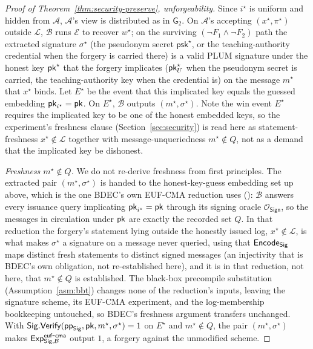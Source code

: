 \begin{proof}[Proof of Theorem~\ref{thm:security-preserve}, unforgeability]
Since $i^\star$ is uniform and hidden from $\mathcal A$, $\mathcal A$'s view is distributed as in $\mathsf G_2$. On $\mathcal A$'s accepting $(x^\star,\pi^\star)$ outside $\mathcal L$, $\mathcal B$ runs $\mathcal E$ to recover $w^\star$; on the surviving $(\neg F_1\wedge\neg F_2)$ path the extracted signature $\sigma^\star$ (the pseudonym secret $\mathsf{psk}^\star$, or the teaching-authority credential when the forgery is carried there) is a valid PLUM signature under the honest key $\mathsf{pk}^\star$ that the forgery implicates ($\mathsf{pk}_U^\star$ when the pseudonym secret is carried, the teaching-authority key when the credential is) on the message $m^\star$ that $x^\star$ binds. Let $E^\star$ be the event that this implicated key equals the guessed embedding $\mathsf{pk}_{i^\star}=\mathsf{pk}$. On $E^\star$, $\mathcal B$ outputs $(m^\star,\sigma^\star)$. Note the win event $E^\star$ requires the implicated key to be one of the honest embedded keys, so the experiment's freshness clause (Section~\ref{sec:security}) is read here as statement-freshness $x^\star\notin\mathcal L$ together with message-unqueriedness $m^\star\notin Q$, not as a demand that the implicated key be dishonest.

\emph{Freshness $m^\star\notin Q$.} We do not re-derive freshness from first principles. The extracted pair $(m^\star,\sigma^\star)$ is handed to the honest-key-guess embedding set up above, which is the one BDEC's own EUF-CMA reduction uses (\cite[Appendix~A.1]{10.1007/978-981-96-0957-4_3}): $\mathcal B$ answers every issuance query implicating $\mathsf{pk}_{i^\star}=\mathsf{pk}$ through its signing oracle $\mathcal O_{\mathsf{Sign}}$, so the messages in circulation under $\mathsf{pk}$ are exactly the recorded set $Q$. In that reduction the forgery's statement lying outside the honestly issued log, $x^\star\notin\mathcal L$, is what makes $\sigma^\star$ a signature on a message never queried, using that $\mathsf{Encode}_{\mathsf{Sig}}$ maps distinct fresh statements to distinct signed messages (an injectivity that is BDEC's own obligation, not re-established here), and it is in that reduction, not here, that $m^\star\notin Q$ is established. The black-box precompile substitution (Assumption~\ref{asm:bbt}) changes none of the reduction's inputs, leaving the signature scheme, its EUF-CMA experiment, and the log-membership bookkeeping untouched, so BDEC's freshness argument transfers unchanged. With $\mathsf{Sig}.\mathsf{Verify}(\mathsf{pp}_{\mathsf{Sig}},\mathsf{pk},m^\star,\sigma^\star)=1$ on $E^\star$ and $m^\star\notin Q$, the pair $(m^\star,\sigma^\star)$ makes $\mathsf{Exp}^{\mathsf{euf\mbox{-}cma}}_{\mathsf{Sig},\mathcal B}$ output $1$, a forgery against the unmodified scheme.


\end{proof}

